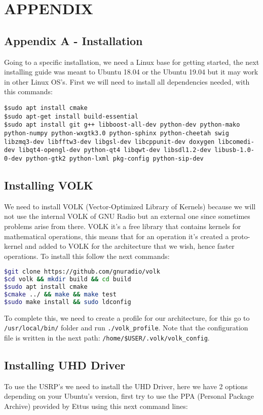 \documentclass[a4paper, 10pt, conference]{ieeeconf}      %
\begin{document}
\section*{APPENDIX}
\subsection{Appendix A - Installation}
Going to a specific installation, we need a Linux base for getting started, the next installing guide was meant to Ubuntu 18.04 or the Ubuntu 19.04 but it may work in other Linux OS's. First we will need to install all dependencies needed, with this commands:

\begin{lstlisting}[breaklines]
$sudo apt install cmake
$sudo apt-get install build-essential
$sudo apt install git g++ libboost-all-dev python-dev python-mako python-numpy python-wxgtk3.0 python-sphinx python-cheetah swig libzmq3-dev libfftw3-dev libgsl-dev libcppunit-dev doxygen libcomedi-dev libqt4-opengl-dev python-qt4 libqwt-dev libsdl1.2-dev libusb-1.0-0-dev python-gtk2 python-lxml pkg-config python-sip-dev
\end{lstlisting}

\subsection{Installing VOLK}
We need to install VOLK (Vector-Optimized Library of Kernels) because we will not use the internal VOLK of GNU Radio but an external one since sometimes problems arise from there. VOLK it's a free library that contains kernels for mathematical operations, this means that for an operation it's created a proto-kernel and added to VOLK for the architecture that we wish, hence faster operations. To install this follow the next commands:

\begin{lstlisting}[language=bash, breaklines]
$git clone https://github.com/gnuradio/volk
$cd volk && mkdir build && cd build
$sudo apt install cmake
$cmake ../ && make && make test
$sudo make install && sudo ldconfig
\end{lstlisting}

To complete this, we need to create a profile for our architecture, for this go to \verb|/usr/local/bin/| folder and run \verb|./volk_profile|. Note that the configuration file is written in the next path: \verb|/home/$USER/.volk/volk_config|.


\subsection{Installing UHD Driver}
To use the USRP's we need to install the UHD Driver, here we have 2 options depending on your Ubuntu's version, first try to use the PPA (Personal Package Archive) provided by Ettus using this next command lines:
\end{document}
